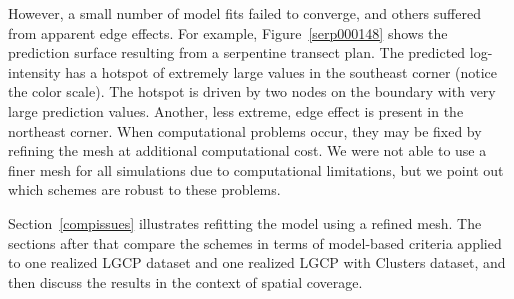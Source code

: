 \documentclass[review]{elsarticle}
\begin{document}
However, a small number of model fits failed to converge, and others suffered
from apparent edge effects.
For example, Figure~\ref{serp000148} shows the prediction surface resulting
from a serpentine transect plan. The predicted log-intensity has a hotspot of
extremely large values in the southeast corner (notice the color scale). The
hotspot is driven by two nodes on the boundary with very large prediction
values. Another, less extreme, edge effect is present in the northeast corner.
When computational problems occur, they may be fixed by refining the mesh at
additional computational cost. We were not able to use a finer mesh for all
simulations due to computational limitations, but we point out which schemes
are robust to these problems.

Section~\ref{compissues} illustrates refitting the model using a refined mesh.
The sections after that compare the schemes in terms of model-based criteria
applied to one realized LGCP dataset and one realized LGCP with Clusters
dataset, and then discuss the results in the context of spatial coverage.
\end{document}
